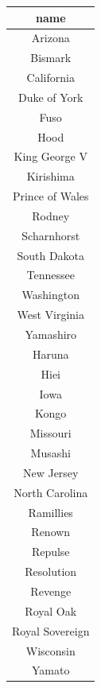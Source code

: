 \documentclass[12pt]{article}
\begin{document}
\begin{enumerate}
\begin{enumerate}[a)]
        \begin{tabular}{|c|}
            \hline
            name\\
            \hline
            Arizona\\
            \hline
            Bismark\\
            \hline
            California\\
            \hline
            Duke of York\\
            \hline
            Fuso\\
            \hline
            Hood\\
            \hline
            King George V\\
            \hline
            Kirishima\\
            \hline
            Prince of Wales\\
            \hline
            Rodney\\
            \hline
            Scharnhorst\\
            \hline
            South Dakota\\
            \hline
            Tennessee\\
            \hline
            Washington\\
            \hline
            West Virginia\\
            \hline
            Yamashiro\\
            \hline
            Haruna\\
            \hline
            Hiei\\
            \hline
            Iowa\\
            \hline
            Kongo\\
            \hline
            Missouri\\
            \hline
            Musashi\\
            \hline
            New Jersey\\
            \hline
            North Carolina\\
            \hline
            Ramillies\\
            \hline
            Renown\\
            \hline
            Repulse\\
            \hline
            Resolution\\
            \hline
            Revenge\\
            \hline
            Royal Oak\\
            \hline
            Royal Sovereign\\
            \hline
            Wisconsin\\
            \hline
            Yamato\\
            \hline
        \end{tabular}


\end{enumerate}
\end{enumerate}
\end{document}

